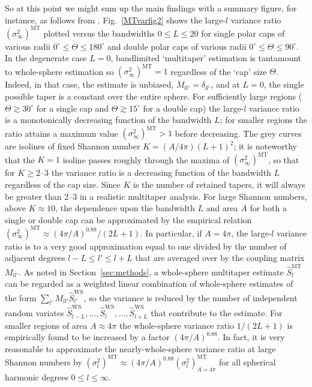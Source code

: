 \documentclass[11pt]{report}
\newcommand{\MT}{^{\mathrm{MT}}}
\newcommand{\ga}{\gtrsim}
\newcommand{\Lpot}{(L+1)^2}
\newcommand{\WS}{^{\mathrm{WS}}}
\begin{document}
So at this point we might sum up the main findings with a summary figure, for instance, as follows from \cite{Dahlen+2008}. Fig.~\ref{MTvarfig2} shows the large-$l$ variance ratio $(\sigma_{\infty}^2)\MT$ plotted versus the bandwidths $0\leq L\leq 20$ for single polar caps of various radii $0^{\circ}\leq\Theta\leq 180^{\circ}$ and double polar caps of various radii $0^{\circ}\leq\Theta\leq 90^{\circ}$. In the degenerate case $L=0$, bandlimited `multitaper' estimation is tantamount to whole-sphere estimation so $(\sigma_{\infty}^2)\MT=1$ regardless of the `cap' size $\Theta$. Indeed, in that case, the estimate is unbiased, $M_{ll'}=\delta_{ll'}$, and at $L=0$, the single possible taper is a constant over the entire sphere. For sufficiently large regions ($\Theta\ga 30^{\circ}$ for a single cap and $\Theta\ga 15^{\circ}$ for a double cap) the large-$l$ variance ratio is a monotonically decreasing function of the bandwidth $L$; for smaller regions the ratio attains a maximum value $(\sigma_{\infty}^2)\MT>1$ before decreasing. The grey curves are isolines of fixed Shannon number $K=(A/4\pi)\Lpot$; it is noteworthy that the $K=1$ isoline passes roughly through the maxima of $(\sigma_{\infty}^2)\MT$, so that for $K\geq 2$--3 the variance ratio is a decreasing function of the bandwidth $L$ regardless of the cap size.  Since $K$ is the number of retained tapers, it will always be greater than 2--3 in a realistic multitaper analysis. For large Shannon numbers, above $K\approx 10$, the dependence upon the bandwidth $L$ and area $A$ for both a single or double cap can be approximated by the empirical relation $(\sigma_{\infty}^2)\MT\approx (4\pi/A)^{0.88}/(2L+1)$.  In particular, if $A=4\pi$, the large-$l$ variance ratio is to a very good approximation equal to one divided by the number of adjacent degrees $l-L\leq l'\leq l+L$ that are averaged over by the coupling matrix $M_{ll'}$. As noted in Section~\ref{sec:methods}, a whole-sphere multitaper estimate $\hat{S}_l\MT$ can be regarded as a weighted linear combination of whole-sphere estimates of the form $\sum_{l'}M_{ll'}\hat{S}_{l'}\WS$, so the variance is reduced by the number of independent random variates $\hat{S}_{l-L}\WS,\ldots,\hat{S}_l\WS, \ldots, \hat{S}_{l+L}\WS$ that contribute to the estimate.  For smaller regions of area $A\approx 4\pi$ the whole-sphere variance ratio $1/(2L+1)$ is empirically found to be increased by a factor $(4\pi/A)^{0.88}$. In fact, it is very reasonable to approximate the nearly-whole-sphere variance ratio at large Shannon numbers by $(\sigma_l^2)\MT\approx (4\pi/A)^{0.88}(\sigma_l^2)\MT_{A=4\pi}$ for all spherical harmonic degrees $0\leq l\leq\infty$.
\end{document}
